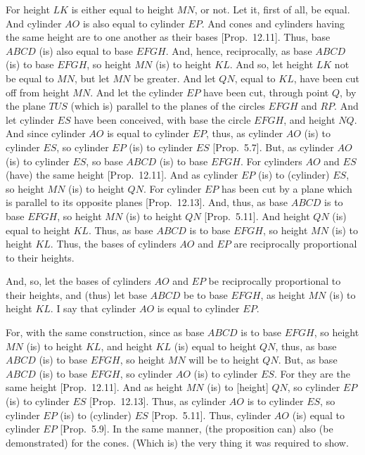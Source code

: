 For height $LK$ is either equal to height $MN$, or not. Let it, first of all, be equal. And cylinder $AO$ is also equal to cylinder $EP$.
And cones and cylinders having the same height are to one another as their bases [Prop.~12.11]. 
Thus, base $ABCD$ (is) also equal to base $EFGH$. And, hence, reciprocally, as base $ABCD$ (is) to base $EFGH$,
so height $MN$ (is) to height $KL$. And so, let height $LK$ not be equal to $MN$, but let $MN$ be greater. And let $QN$, equal to
$KL$, have been cut off from height $MN$. And let the cylinder $EP$ have been cut, through point $Q$, by the plane $TUS$ (which is)
parallel to the planes of the circles $EFGH$ and $RP$. And let cylinder $ES$ have been conceived, with base the circle $EFGH$, and
height $NQ$. And since cylinder $AO$ is equal to cylinder $EP$, thus, as cylinder $AO$ (is) to cylinder $ES$, so cylinder
$EP$ (is) to cylinder $ES$ [Prop.~5.7]. But, as cylinder $AO$ (is) to cylinder $ES$, so base $ABCD$ (is)
to base $EFGH$. For cylinders $AO$ and $ES$ (have)  the same height [Prop.~12.11]. 
And as cylinder $EP$ (is) to (cylinder) $ES$, so height $MN$ (is) to height  $QN$. For cylinder $EP$
has been cut by a plane which is parallel to its opposite planes [Prop.~12.13].
And, thus, as base $ABCD$ is to base $EFGH$, so height $MN$ (is) to height $QN$ [Prop.~5.11]. And height $QN$
(is) equal to height $KL$. Thus, as base $ABCD$ is to base $EFGH$, so height $MN$ (is) to height $KL$.
Thus, the bases of cylinders $AO$ and $EP$ are reciprocally proportional to their heights.

And, so, let the bases of cylinders $AO$ and $EP$ be reciprocally proportional to their heights, and (thus) let
base $ABCD$ be to base $EFGH$, as height $MN$ (is) to height $KL$. I say that cylinder $AO$ is equal to
cylinder $EP$.

For, with the same construction, since  as base $ABCD$ is to base $EFGH$, so  height $MN$ (is) to height $KL$, and
height $KL$ (is) equal to height $QN$, thus, as base $ABCD$ (is) to base $EFGH$, so height $MN$ will be to height $QN$.
But, as base $ABCD$ (is) to base $EFGH$, so cylinder $AO$ (is) to cylinder $ES$. For they are the same height [Prop.~12.11]. 
And as height $MN$ (is) to [height] $QN$, so cylinder $EP$ (is) to cylinder $ES$ [Prop.~12.13].
Thus, as cylinder $AO$ is to cylinder $ES$, so cylinder $EP$ (is) to (cylinder) $ES$ [Prop.~5.11]. Thus, cylinder $AO$ (is)
equal to cylinder $EP$ [Prop.~5.9]. In the same manner, (the proposition can) also (be demonstrated)
for the cones. (Which is) the very thing it was required to show.

